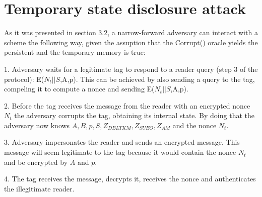 \section{Temporary state disclosure attack}

    As it was presented in section 3.2, a narrow-forward adversary can interact with a scheme the following way, given the assuption that
    the Corrupt() oracle yields the persistent and the temporary memory is true:

    1. Adversary waits for a legitimate tag to respond to a reader query (step 3 of the protocol): E($N_t||S$,A,p).
    This can be achieved by also sending a query to the tag, compeling it to compute a nonce and sending E($N_t||S$,A,p).

    2. Before the tag receives the message from the reader with an encrypted nonce $N_t$ the adversary corrupts the tag, obtaining
    its internal state. By doing that the adversary now knows $A, B, p, S, Z_{DBLTKM}, Z_{SUEO}, Z_{AM}$ and the nonce $N_t$.
    
    3. Adversary impersonates the reader and sends an encrypted message. This message will seem legitimate to the tag because it would
    contain the nonce $N_t$ and be encrypted by $A$ and $p$.

    4. The tag receives the message, decrypts it, receives the nonce and authenticates the illegitimate reader.


